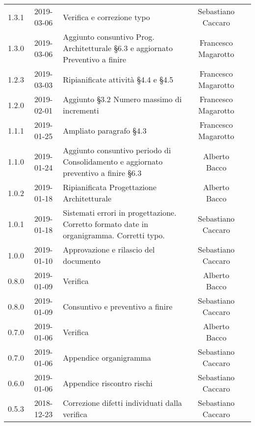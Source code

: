 {\begin{longtable}{ c c  C{4cm}  c  c }
		1.3.1 & 2019-03-06 & Verifica e correzione typo & Sebastiano Caccaro & \ver{}\\

		1.3.0 & 2019-03-06 & Aggiunto consuntivo Prog. Architetturale §6.3 e aggiornato Preventivo a finire & Francesco Magarotto & \reda{}\\

		1.2.3 & 2019-03-03 & Ripianificate attività §4.4 e §4.5 & Francesco Magarotto & \reda{}\\

		1.2.0 & 2019-02-01 & Aggiunto §3.2 Numero massimo di incrementi & Francesco Magarotto & \reda{}\\

		1.1.1 & 2019-01-25 & Ampliato paragrafo §4.3 & Francesco Magarotto & \reda{}\\

		1.1.0 & 2019-01-24 & Aggiunto consuntivo periodo di Consolidamento  e aggiornato preventivo a finire §6.3 & Alberto Bacco & \reda{}\\

		1.0.2 & 2019-01-18 & Ripianificata Progettazione Architetturale & Alberto Bacco & \Res{} \\

		1.0.1 & 2019-01-18 & Sistemati errori in progettazione. Corretto formato date in organigramma. Corretti typo. & Sebastiano Caccaro & \reda{}\\

		1.0.0 & 2019-01-10 & Approvazione e rilascio del documento & Sebastiano Caccaro & \Res{}\\

		0.8.0 & 2019-01-09 & Verifica & Alberto Bacco & \ver{}\\
		
		0.8.0 & 2019-01-09 & Consuntivo e preventivo a finire & Sebastiano Caccaro & \reda{}\\			
		
		0.7.0 & 2019-01-06 & Verifica & Alberto Bacco & \ver{}\\		
		
		0.7.0 & 2019-01-06 & Appendice organigramma & Sebastiano Caccaro & \reda{}\\		
		
		0.6.0 & 2019-01-06 & Appendice riscontro rischi & Sebastiano Caccaro & \reda{}\\
					
		0.5.3 & 2018-12-23 & Correzione difetti individuati dalla verifica & Sebastiano Caccaro & \reda{}\\		
		

\end{longtable}}
